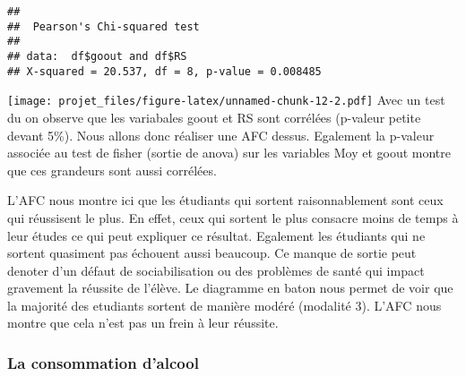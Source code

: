 \documentclass[
]{article}
\newenvironment{Shaded}{\begin{snugshade}}{\end{snugshade}}
\newcommand{\CommentTok}[1]{\textcolor[rgb]{0.56,0.35,0.01}{\textit{#1}}}
\newcommand{\FunctionTok}[1]{\textcolor[rgb]{0.00,0.00,0.00}{#1}}
\newcommand{\NormalTok}[1]{#1}
\newcommand{\OtherTok}[1]{\textcolor[rgb]{0.56,0.35,0.01}{#1}}
\newcommand{\SpecialCharTok}[1]{\textcolor[rgb]{0.00,0.00,0.00}{#1}}
\begin{document}
\begin{Shaded}
\end{Shaded}

\begin{verbatim}
## 
##  Pearson's Chi-squared test
## 
## data:  df$goout and df$RS
## X-squared = 20.537, df = 8, p-value = 0.008485
\end{verbatim}

\begin{Shaded}
\end{Shaded}

\texttt{[image: projet\_files/figure-latex/unnamed-chunk-12-2.pdf]} Avec
un test du  on observe que les variabales goout et RS sont
corrélées (p-valeur petite devant 5\%). Nous allons donc réaliser une
AFC dessus. Egalement la p-valeur associée au test de fisher (sortie de
anova) sur les variables Moy et goout montre que ces grandeurs sont
aussi corrélées.

L'AFC nous montre ici que les étudiants qui sortent raisonnablement sont
ceux qui réussisent le plus. En effet, ceux qui sortent le plus consacre
moins de temps à leur études ce qui peut expliquer ce résultat.
Egalement les étudiants qui ne sortent quasiment pas échouent aussi
beaucoup. Ce manque de sortie peut denoter d'un défaut de
sociabilisation ou des problèmes de santé qui impact gravement la
réussite de l'élève. Le diagramme en baton nous permet de voir que la
majorité des etudiants sortent de manière modéré (modalité 3). L'AFC
nous montre que cela n'est pas un frein à leur réussite.

\hypertarget{la-consommation-dalcool}{%
\subsubsection{La consommation d'alcool}\label{la-consommation-dalcool}}
\end{document}
